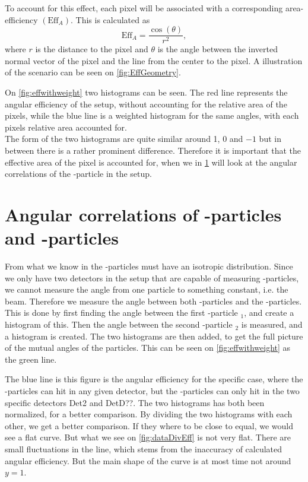 To account for this effect, each pixel will be associated with a corresponding area-efficiency $(\text{Eff}_A)$.
This is calculated as 
\begin{equation}
\text{Eff}_A = \dfrac{\cos(\theta)}{r^2 },
\end{equation}
where $r$ is the distance to the pixel and $\theta$ is the angle between the inverted normal vector of the pixel and the line from the center to the pixel. A illustration of the scenario can be seen on \cref{fig:EffGeometry}.

On \cref{fig:effwithweight} two histograms can be seen. The red line represents the angular efficiency of the setup, without accounting for the relative area of the pixels, while the blue line is a weighted histogram for the same angles, with each pixels relative area accounted for. \\
The form of the two histograms are quite similar around 1, 0 and $-1$ but in between there is a rather prominent difference. Therefore it is important that the effective area of the pixel is accounted for, when we in \cref{sec:betaAngle} will look at the angular correlations of the \be-particle in the setup. 



\section{Angular correlations of \al-particles and \be-particles}
\label{sec:betaAngle}
From what we know in  the \be-particles must have an isotropic distribution. Since we only have two detectors in the setup that are capable of measuring \be-particles, we cannot measure the angle from one particle to something constant, i.e. the beam. Therefore we measure the angle between both \al-particles and the \be-particles.
This is done by first finding the angle between the first \al-particle \al$_1$, and create a histogram of this. Then the angle between the second \al-particle \al$_2$ is measured, and a histogram is created. The two histograms are then added, to get the full picture of the mutual angles of the particles. 
This can be seen on \cref{fig:effwithweight} as the green line.  

The blue line is this figure is the angular efficiency for the specific case, where the \al-particles can hit in any given detector, but the \be-particles can only hit in the two specific detectors Det2 and DetD??. The two histograms has both been normalized, for a better comparison. By dividing the two histograms with each other, we get a better comparison. If they where to be close to equal, we would see a flat curve. But what we see on \cref{fig:dataDivEff} is not very flat. 
There are small fluctuations in the line, which stems from the inaccuracy of calculated angular efficiency. But the main shape of the curve is at most time not around $y=1$.

